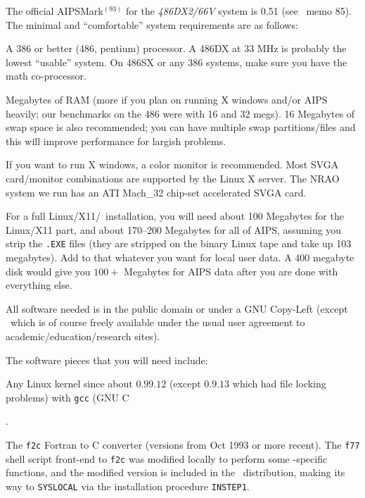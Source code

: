 {{The official {AIPSMark$^{(93)}$} for the {\it 486DX2/66V\/} system is 0.51
(see \AIPS\ memo 85).  The minimal and ``comfortable'' system requirements
are as follows:

\item\bul A 386 or better (486, pentium) processor.  A 486DX at 33
        MHz is probably the lowest ``usable'' system.  On 486SX or any 386
        systems, make sure you have the math co-processor.

\item{} Megabytes of RAM (more if you plan on running X windows and/or
        AIPS heavily; our benchmarks on the 486 were with 16 and 32 megs).
        16 Megabytes of swap space is also recommended; you can have
        multiple swap partitions/files and this will improve performance
        for largish problems.

\item\bul If you want to run X windows, a color monitor is
        recommended.  Most SVGA card/monitor combinations are supported by
        the Linux X server.  The NRAO system we run has an ATI Mach\_32
        chip-set accelerated SVGA card.

\item\bul For a full Linux/X11/\AIPS\ installation, you will need
        about 100 Megabytes for the Linux/X11 part, and about 170--200
        Megabytes for all of AIPS, assuming you strip the {\tt *.EXE}
        files (they are stripped on the binary Linux tape and take up 103
        megabytes).  Add to that whatever you want for local user data.  A
        400 megabyte disk would give you $100+$ Megabytes for AIPS data
        after you are done with everything else.

\item\bul All software needed is in the public domain or under a
        GNU Copy-Left (except \AIPS\ which is of course freely available
        under the usual user agreement to academic/education/research
        sites).

\medskip\noindent
The software pieces that you will need include:\medskip

\item\bul Any Linux kernel since about $0.99.12$ (except $0.9.13$ which
          had file locking problems) with {\tt gcc} (GNU C}.
\item\bul The {\tt f2c} Fortran to C converter (versions from Oct 1993 or
          more recent).  The {\tt f77} shell script front-end to {\tt f2c}
          was modified locally to perform some \AIPS -specific functions,
          and the modified version is included in the \AIPS\ distribution,
          making its way to {\tt\dol SYSLOCAL} via the installation
          procedure {\tt INSTEP1}. \medskip

}
